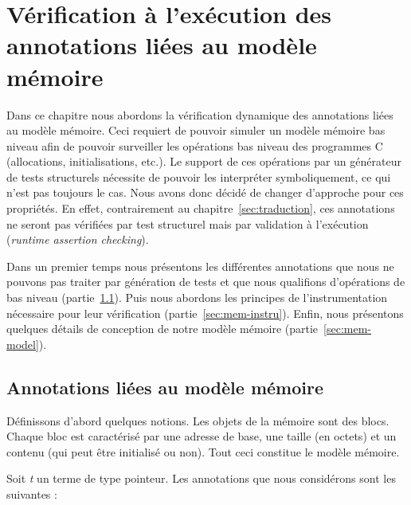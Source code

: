 
\chapter{Vérification à l'exécution des annotations liées au modèle mémoire}
\label{sec:runtime}

\chapterintro

Dans ce chapitre nous abordons la vérification dynamique des annotations liées
au modèle mémoire.
Ceci requiert de pouvoir simuler un modèle mémoire bas niveau afin de pouvoir
surveiller les opérations bas niveau des programmes C (allocations,
initialisations, etc.).
Le support de ces opérations par un générateur de tests structurels nécessite
de pouvoir les interpréter symboliquement, ce qui n'est pas toujours le cas.
Nous avons donc décidé de changer d'approche pour ces propriétés.
En effet, contrairement au chapitre~\ref{sec:traduction}, ces annotations ne
seront pas vérifiées par test structurel mais par validation à l'exécution
({\em runtime assertion checking}).

Dans un premier temps nous présentons les différentes annotations que nous ne
pouvons pas traiter par génération de tests et que nous qualifions d'opérations
de bas niveau (partie~\ref{sec:mem-annots}).
Puis nous abordons les principes de l'instrumentation nécessaire pour leur
vérification (partie~\ref{sec:mem-instru}).
Enfin, nous présentons quelques détails de conception de notre modèle mémoire
(partie~\ref{sec:mem-model}).


\section{Annotations liées au modèle mémoire}
\label{sec:mem-annots}


Définissons d'abord quelques notions.
Les objets de la mémoire sont des blocs.
Chaque bloc est caractérisé par une adresse de base, une taille (en octets) et
un contenu (qui peut être initialisé ou non).
Tout ceci constitue le modèle mémoire.

Soit \textit{t} un terme \eacsl de type pointeur.
Les annotations \eacsl que nous considérons sont les suivantes :

